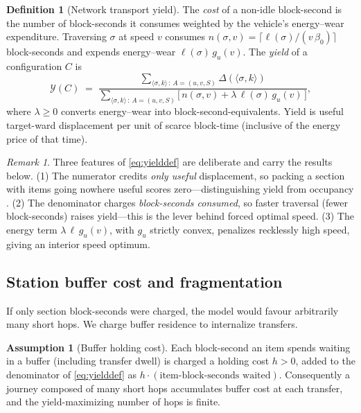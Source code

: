 \documentclass[11pt,twocolumn,a4paper]{article}
\theoremstyle{definition}
\newtheorem{definition}[theorem]{Definition}
\newtheorem{assumption}[theorem]{Assumption}
\theoremstyle{remark}
\newtheorem{remark}[theorem]{Remark}
\newcommand{\yield}{\mathcal{Y}}
\newcommand{\blocktime}{\beta_0}
\begin{document}
\begin{definition}[Network transport yield]
\label{def:yield}
The \emph{cost} of a non-idle block-second is the number of block-seconds it consumes weighted by the vehicle's energy--wear expenditure. Traversing $\sigma$ at speed $v$ consumes $n(\sigma,v)=\lceil \ell(\sigma)/(v\,\blocktime)\rceil$ block-seconds and expends energy--wear $\ell(\sigma)\,g_u(v)$. The \emph{yield} of a configuration $C$ is
\begin{equation}
\label{eq:yielddef}
\yield(C) \;=\; \frac{\displaystyle\sum_{\langle\sigma,k\rangle\,:\,A=(u,v,S)} \Delta(\langle\sigma,k\rangle)}
{\displaystyle\sum_{\langle\sigma,k\rangle\,:\,A=(u,v,S)} \big[\, n(\sigma,v) + \lambda\,\ell(\sigma)\,g_u(v) \,\big]},
\end{equation}
where $\lambda\ge 0$ converts energy--wear into block-second-equivalents. Yield is useful target-ward displacement per unit of scarce block-time (inclusive of the energy price of that time).
\end{definition}

\begin{remark}
\label{rem:objective_choice}
Three features of \eqref{eq:yielddef} are deliberate and carry the results below.
(1) The numerator credits \emph{only useful} displacement, so packing a section with items going nowhere useful scores zero---distinguishing yield from occupancy \cite{uic406}.
(2) The denominator charges \emph{block-seconds consumed}, so faster traversal (fewer block-seconds) raises yield---this is the lever behind forced optimal speed.
(3) The energy term $\lambda\,\ell\,g_u(v)$, with $g_u$ strictly convex, penalizes recklessly high speed, giving an interior speed optimum.
\end{remark}

\subsection{Station buffer cost and fragmentation}

If only section block-seconds were charged, the model would favour arbitrarily many short hops. We charge buffer residence to internalize transfers.

\begin{assumption}[Buffer holding cost]
\label{ass:buffer}
Each block-second an item spends waiting in a buffer (including transfer dwell) is charged a holding cost $h > 0$, added to the denominator of \eqref{eq:yielddef} as $h\cdot(\text{item-block-seconds waited})$. Consequently a journey composed of many short hops accumulates buffer cost at each transfer, and the yield-maximizing number of hops is finite.
\end{assumption}
\end{document}
